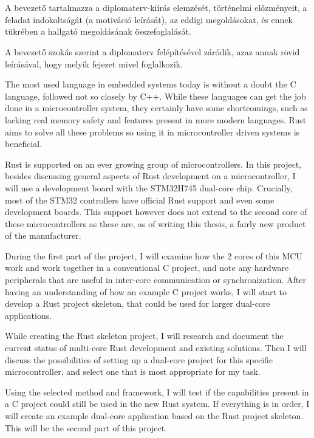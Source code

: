 \chapter{\bevezetes}

A bevezető tartalmazza a diplomaterv-kiírás elemzését, történelmi előzményeit, a feladat indokoltságát (a motiváció leírását), az eddigi megoldásokat, és ennek tükrében a hallgató megoldásának összefoglalását.

A bevezető szokás szerint a diplomaterv felépítésével záródik, azaz annak rövid leírásával, hogy melyik fejezet mivel foglalkozik.


The most used language in embedded systems today is without a doubt the C language, followed not so closely by C++. While these languages can get the job done in a microcontroller system, they certainly have some shortcomings, such as lacking real memory safety and features present in more modern languages. Rust aims to solve all these problems so using it in microcontroller driven systems is beneficial.

Rust is supported on an ever growing group of microcontrollers. In this project, besides discussing general aspects of Rust development on a microcontroller, I will use a development board with the STM32H745 dual-core chip. Crucially, most of the STM32 controllers have official Rust support and even some development boards. This support however does not extend to the second core of these microcontrollers as these are, as of writing this thesis, a fairly new product of the manufacturer.

During the first part of the project, I will examine how the 2 cores of this MCU work and work together in a conventional C project, and note any hardware peripherals that are useful in inter-core communication or synchronization. After having an understanding of how an example C project works, I will start to develop a Rust project skeleton, that could be used for larger dual-core applications.

While creating the Rust skeleton project, I will research and document the current status of multi-core Rust development and existing solutions. Then I will discuss the possibilities of setting up a dual-core project for this specific microcontroller, and select one that is most appropriate for my task.

Using the selected method and framework, I will test if the capabilities present in a C project could still be used in the new Rust system. If everything is in order, I will create an example dual-core application based on the Rust project skeleton. This will be the second part of this project.
